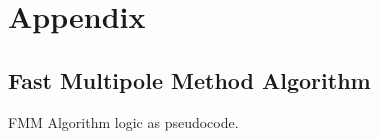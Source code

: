 \chapter{Appendix}

\section{Fast Multipole Method Algorithm}\label{app:a_1_fmm_algorithm}

FMM Algorithm logic as pseudocode.
